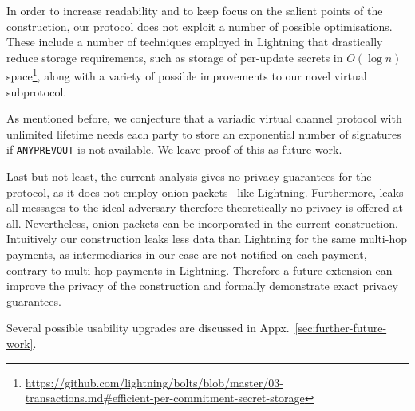   In order to increase readability and to keep focus on the salient points of
  the construction, our protocol does not exploit a number of possible
  optimisations. These include a number of techniques employed in Lightning that
  drastically reduce storage requirements, such as storage of per-update secrets
  in $O(\log n)$
  space\footnote{\url{https://github.com/lightning/bolts/blob/master/03-transactions.md\#efficient-per-commitment-secret-storage}},
  along with a variety of possible improvements to our novel virtual
  subprotocol.

  As mentioned before, we conjecture that a variadic virtual
  channel protocol with unlimited lifetime needs each party to store an
  exponential number of signatures if \texttt{ANYPREVOUT} is not available. We
  leave proof of this as future work.

  Last but not least, the current analysis gives no privacy guarantees for the
  protocol, as it does not employ onion packets~\cite{sphinx} like Lightning.
  Furthermore, \fchan leaks all messages to the ideal adversary therefore
  theoretically no privacy is offered at all. Nevertheless, onion packets can be
  incorporated in the current construction. Intuitively our construction
  leaks less data than Lightning for the same multi-hop payments, as
  intermediaries in our case are not notified on each payment, contrary to
  multi-hop payments in Lightning. Therefore a future extension can improve the
  privacy of the construction and formally demonstrate exact privacy guarantees.

  Several possible usability upgrades are discussed in
  Appx.~\ref{sec:further-future-work}.
